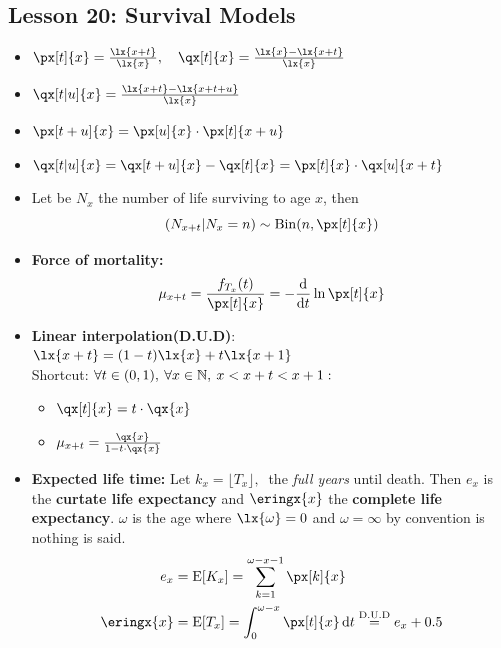 \documentclass[10pt, french]{article}
\begin{document}
\begin{multicols*}{3}
\section*{Lesson 20: Survival Models}
\begin{itemize}[align=left,leftmargin=*]
    \item $\px[t]{x} = \frac{\lx{x+t}}{\lx{x}},\quad \qx[t]{x}=\frac{\lx{x} - \lx{x+t}}{\lx{x}}$
    \item $\qx[t|u]{x}=\frac{\lx{x+t} - \lx{x+t+u} }{\lx{x}}$
    \item $\px[t+u]{x} = \px[u]{x} \cdot \px[t]{x+u}$
    \item $\qx[t|u]{x}=\qx[t+u]{x} - \qx[t]{x} = \px[t]{x}\cdot \qx[u]{x+t} $
    \item Let be $N_x$ the number of life surviving to age $x$, then  \[ (N_{x+t}|N_x=n)\sim\mathrm{Bin}(n, \px[t]{x}) \]
    \item \textbf{Force of mortality:} \[ \mu_{x+t} = \frac{f_{T_x}(t)}{\px[t]{x}} = - \frac{\diff}{\diff{t}} \ln \px[t]{x} \]
    \item \textbf{Linear interpolation(D.U.D)}:\\ \hspace*{1cm} $  \lx{x+t} = (1-t)\lx{x}+t \lx{x+1}$ \\  Shortcut: $\forall t \in (0,1),\: \forall x \in \mathbb{N},\: x<x+t<x+1:$
    \begin{minipage}{3cm}
        \vspace{.2cm}
        \begin{itemize}[align=left,leftmargin=*]
            \item[\ding{223}] $\qx[t]{x}=t\cdot \qx{x}$
            \item[\ding{223}] $\mu_{x+t}=\frac{\qx{x}}{1-t\cdot \qx{x}}$
        \end{itemize}
    \end{minipage}
    \item \textbf{Expected life time:} Let $k_x = \lfloor T_x \rfloor,\:$ the \emph{full years} until death. Then $e_x$ is the \textbf{curtate life expectancy} and $\eringx{x}$ the \textbf{complete life expectancy}. $\omega$ is the age where $\lx{\omega}=0$ and $\omega = \infty$ by convention is nothing is said.
    \begin{align*}
        e_x &= \esp{K_x} = \sum_{k=1}^{\omega-x-1} \px[k]{x} \\
        \eringx{x} &= \esp{T_x} = \int_0^{\omega-x} \px[t]{x} \diff{t} \stackrel{\text{D.U.D}}{=} e_x + 0.5
    \end{align*}
\end{itemize}


\end{multicols*}
\end{document}
